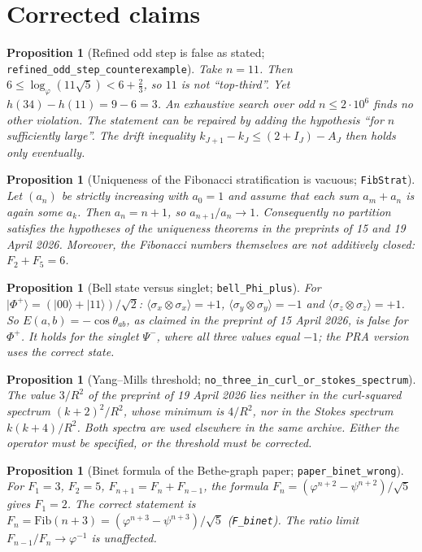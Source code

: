 \documentclass[11pt]{article}
\newtheorem{proposition}[theorem]{Proposition}
\theoremstyle{remark}
\newcommand{\lean}[1]{\texttt{#1}}
\begin{document}
\section{Corrected claims}
\begin{proposition}[Refined odd step is false as stated; \lean{refined\_odd\_step\_counterexample}]
Take $n=11$. Then $6\le\log_\varphi(11\sqrt5)<6+\tfrac23$, so $11$ is not ``top-third''.
Yet $h(34)-h(11)=9-6=3$. An exhaustive search over odd $n\le2\cdot10^6$ finds no other
violation. The statement can be repaired by adding the hypothesis ``for $n$ sufficiently
large''. The drift inequality $k_{J+1}-k_J\le(2+I_J)-A_J$ then holds only eventually.
\end{proposition}

\begin{proposition}[Uniqueness of the Fibonacci stratification is vacuous; \lean{FibStrat}]
Let $(a_n)$ be strictly increasing with $a_0=1$ and assume that each sum $a_m+a_n$ is again
some $a_k$. Then $a_n=n+1$, so $a_{n+1}/a_n\to1$. Consequently no partition satisfies the
hypotheses of the uniqueness theorems in the preprints of 15 and 19 April 2026. Moreover,
the Fibonacci numbers themselves are not additively closed: $F_2+F_5=6$.
\end{proposition}

\begin{proposition}[Bell state versus singlet; \lean{bell\_Phi\_plus}]
For $|\Phi^+\rangle=(|00\rangle+|11\rangle)/\sqrt2$:
$\langle\sigma_x\otimes\sigma_x\rangle=+1$, $\langle\sigma_y\otimes\sigma_y\rangle=-1$ and
$\langle\sigma_z\otimes\sigma_z\rangle=+1$. So $E(a,b)=-\cos\theta_{ab}$, as claimed in the
preprint of 15 April 2026, is false for $\Phi^+$. It holds for the singlet $\Psi^-$, where all
three values equal $-1$; the PRA version uses the correct state.
\end{proposition}

\begin{proposition}[Yang--Mills threshold; \lean{no\_three\_in\_curl\_or\_stokes\_spectrum}]
The value $3/R^2$ of the preprint of 19 April 2026 lies neither in the curl-squared spectrum
$(k+2)^2/R^2$, whose minimum is $4/R^2$, nor in the Stokes spectrum $k(k+4)/R^2$. Both
spectra are used elsewhere in the same archive. Either the operator must be specified, or the
threshold must be corrected.
\end{proposition}

\begin{proposition}[Binet formula of the Bethe-graph paper; \lean{paper\_binet\_wrong}]
For $F_1=3$, $F_2=5$, $F_{n+1}=F_n+F_{n-1}$, the formula
$F_n=(\varphi^{n+2}-\psi^{n+2})/\sqrt5$ gives $F_1=2$. The correct statement is
$F_n=\mathrm{Fib}(n+3)=(\varphi^{n+3}-\psi^{n+3})/\sqrt5$ (\lean{F\_binet}). The ratio limit
$F_{n-1}/F_n\to\varphi^{-1}$ is unaffected.
\end{proposition}
\end{document}
